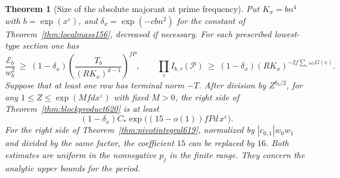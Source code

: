 \documentclass[a4paper,11pt]{article}
\newtheorem{theorem}[proposition]{Theorem}
\theoremstyle{definition}
\theoremstyle{remark}
\numberwithin{equation}{section}
\begin{document}
\begin{theorem}[Size of the absolute majorant at prime frequency]
\leavevmode\label{thm:exteriorcost620}
Put \(K_x=bn^4\) with \(b=\exp(x^\varepsilon)\), and
\(\delta_x=\exp(-c b n^2)\) for the constant of
Theorem~\ref{thm:localmass156}, decreased if necessary.
For each prescribed lowest-type section one has
\[
 \frac{\mathcal E_b}{w_b^2}\ \ge\
 (1-\delta_x)
     \left(\frac{T_b}{(RK_x)^{d-1}}\right)^{fP},\qquad
 \prod_\tau I_{b,\tau}(\mathcal P)\ \ge\
 (1-\delta_x)(RK_x)^{-2f\sum_e\omega_e G(e)} .
\]
Suppose that at least one row has terminal norm \(-T\).
After division by \(Z^{b_h/2}\), for any
\(1\le Z\le\exp(Mfd x^\varepsilon)\) with fixed \(M>0\), the
right side of Theorem~\ref{thm:blockproduct620} is at least
\[
 (1-\delta_x) C_*
        \exp\bigl((15-o(1)) fP d\,x^\varepsilon\bigr).
\]
For the right side of Theorem~\ref{thm:pivotintegral619},
normalized by \(|c_{0,1}|w_0w_1\) and divided by the same
factor, the coefficient \(15\) can be replaced by \(16\).
Both estimates are uniform in the nonnegative \(p_j\) in the
finite range. They concern the analytic upper bounds for the
period.
\end{theorem}
\end{document}
